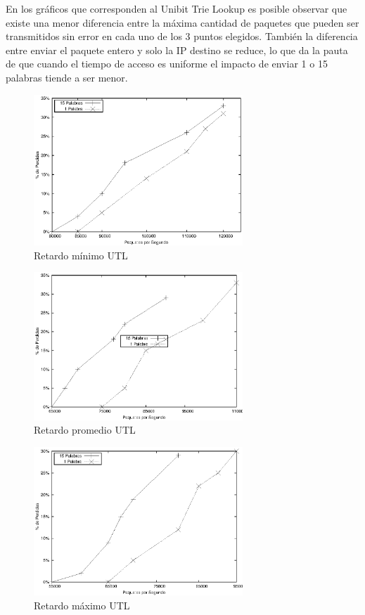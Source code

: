 En los gráficos que corresponden al Unibit Trie Lookup es posible observar que existe una menor diferencia entre la máxima cantidad de paquetes que pueden ser transmitidos sin error en cada uno de los 3 puntos elegidos. También la diferencia entre enviar el paquete entero y solo la IP destino se reduce, lo que da la pauta de que cuando el tiempo de acceso es uniforme el impacto de enviar 1 o 15 palabras tiende a ser menor.
\newpage
\begin{figure}[!h]
  \centering
	\includegraphics[width=0.7\textwidth]{5-resultados/graf/utlmin.eps}
  \caption{Retardo mínimo UTL}
  \label{fig}
\end{figure}
\begin{figure}[!h]
  \centering
	\includegraphics[width=0.7\textwidth]{5-resultados/graf/utlprom.eps}
  \caption{Retardo promedio UTL}
  \label{fig}
\end{figure}
\begin{figure}[!h]
  \centering
	\includegraphics[width=0.7\textwidth]{5-resultados/graf/utlmax.eps}
  \caption{Retardo máximo UTL}
  \label{fig}
\end{figure}

